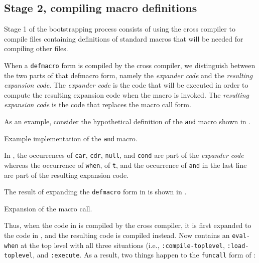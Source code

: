 \subsection{Stage 2, compiling macro definitions}

Stage 1 of the bootstrapping process consists of using the cross
compiler to compile files containing definitions of standard macros
that will be needed for compiling other files. 

When a \texttt{defmacro} form is compiled by the cross compiler, we
distinguish between the two parts of that defmacro form, namely the
\emph{expander code} and the \emph{resulting expansion code}.  The
\emph{expander code} is the code that will be executed in order to
compute the resulting expansion code when the macro is invoked.  The
\emph{resulting expansion code} is the code that replaces the macro
call form. 

As an example, consider the hypothetical definition of the
\texttt{and} macro shown in .

\begin{codefragment}
\caption{\label{code-defmacro-and}
Example implementation of the \texttt{and} macro.}
\end{codefragment}

In , the occurrences of \texttt{car},
\texttt{cdr}, \texttt{null}, and \texttt{cond} are part of the
\emph{expander code} whereas the occurrence of \texttt{when}, of
\texttt{t}, and the occurrence of \texttt{and} in the last line are
part of the resulting expansion code. 

The result of expanding the \texttt{defmacro} form in
 is shown in
. 

\begin{codefragment}
\caption{\label{code-macro-expansion-and}
Expansion of the macro call.}
\end{codefragment}

Thus, when the code in  is compiled by the
cross compiler, it is first expanded to the code in
, and the resulting code is compiled
instead.  Now  contains an
\texttt{eval-when} at the top level with all three situations (i.e.,
\texttt{:compile-toplevel}, \texttt{:load-toplevel}, and
\texttt{:execute}.  As a result, two things happen to the
\texttt{funcall} form of :

